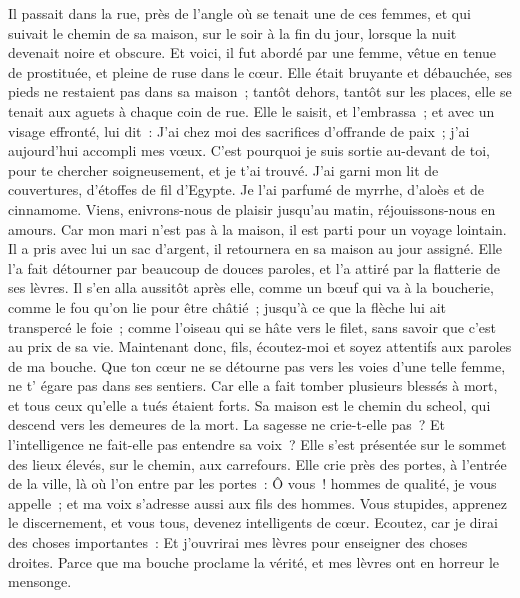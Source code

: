 \begin{multicols}{2}
Il passait dans la rue, près de l'angle où se tenait une de ces femmes, et qui suivait le chemin de sa maison,
sur le soir à la fin du jour, lorsque la nuit devenait noire et obscure.
Et voici, il fut abordé par une femme, vêtue en tenue de prostituée, et pleine de ruse dans le cœur.
Elle était bruyante et débauchée, ses pieds ne restaient pas dans sa maison~;
tantôt dehors, tantôt sur les places, elle se tenait aux aguets à chaque coin de rue.
Elle le saisit, et l'embrassa~; et avec un visage effronté, lui dit~:
J'ai chez moi des sacrifices d'offrande de paix~; j'ai aujourd'hui accompli mes vœux.
C'est pourquoi je suis sortie au-devant de toi, pour te chercher soigneusement, et je t'ai trouvé.
J'ai garni mon lit de couvertures, d'étoffes de fil d'Egypte.
Je l'ai parfumé de myrrhe, d'aloès et de cinnamome.
Viens, enivrons-nous de plaisir jusqu'au matin, réjouissons-nous en amours.
Car mon mari n'est pas à la maison, il est parti pour un voyage lointain.
Il a pris avec lui un sac d'argent, il retournera en sa maison au jour assigné.
Elle l'a fait détourner par beaucoup de douces paroles, et l'a attiré par la flatterie de ses lèvres.
Il s'en alla aussitôt après elle, comme un bœuf qui va à la boucherie, comme le fou qu'on lie pour être châtié~;
jusqu'à ce que la flèche lui ait transpercé le foie~; comme l'oiseau qui se hâte vers le filet, sans savoir que c'est au prix de sa vie.
Maintenant donc, fils, écoutez-moi et soyez attentifs aux paroles de ma bouche.
Que ton cœur ne se détourne pas vers les voies d'une telle femme, ne t' égare pas dans ses sentiers.
Car elle a fait tomber plusieurs blessés à mort, et tous ceux qu'elle a tués étaient forts.
Sa maison est le chemin du scheol, qui descend vers les demeures de la mort.
\VerseOne{}La sagesse ne crie-t-elle pas~? Et l'intelligence ne fait-elle pas entendre sa voix~?
Elle s'est présentée sur le sommet des lieux élevés, sur le chemin, aux carrefours.
Elle crie près des portes, à l'entrée de la ville, là où l'on entre par les portes~:
Ô vous~! hommes de qualité, je vous appelle~; et ma voix s'adresse aussi aux fils des hommes.
Vous stupides, apprenez le discernement, et vous tous, devenez intelligents de cœur.
Ecoutez, car je dirai des choses importantes~: Et j'ouvrirai mes lèvres pour enseigner des choses droites.
Parce que ma bouche proclame la vérité, et mes lèvres ont en horreur le mensonge.

\end{multicols}

